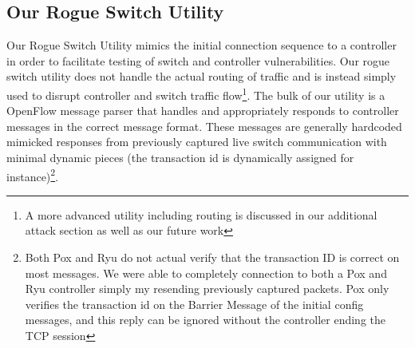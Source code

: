 \subsection{Our Rogue Switch Utility}
Our Rogue Switch Utility mimics the initial connection sequence to a controller in order to facilitate testing of switch and controller vulnerabilities. Our rogue switch utility does not handle the actual routing of traffic and is instead simply used to disrupt controller and switch traffic flow\footnote{A more advanced utility including routing is discussed in our additional attack section as well as our future work}. The bulk of our utility is a OpenFlow message parser that handles and appropriately responds to controller messages in the correct message format. These messages are generally hardcoded mimicked responses from previously captured live switch communication with minimal dynamic pieces (the transaction id is dynamically assigned for instance)\footnote{Both Pox and Ryu do not actual verify that the transaction ID is correct on most messages. We were able to completely connection to both a Pox and Ryu controller simply my resending previously captured packets. Pox only verifies the transaction id on the Barrier Message of the initial config messages, and this reply can be ignored without the controller ending the TCP session}. 
